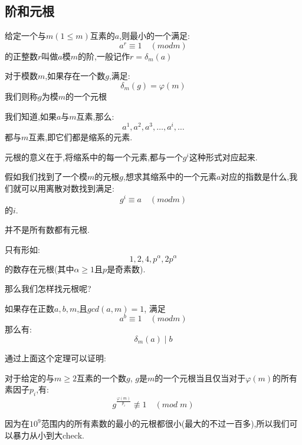 \documentclass[9pt]{beamer}
\begin{document}
		\subsection{阶和元根}
		\begin{frame}
			\begin{definition}[阶]
				给定一个与$m(1 \leq m)$互素的$a$,则最小的一个满足:
				$$
					a^r \equiv 1 \quad (mod m)
				$$
				的正整数$r$叫做$a$模$m$的阶,一般记作$r = \delta_m(a)$
			\end{definition}
			
						\pause
			
			\begin{definition}[元根] 
				对于模数$m$,如果存在一个数$g$,满足:
				$$
					\delta_m(g) = \varphi(m)
				$$
				我们则称$g$为模$m$的一个元根
			\end{definition}
		\end{frame}
		\begin{frame}
			我们知道,如果$a$与$m$互素,那么:
			$$
				a^1, a^2, a^3,\dots,a^i,\dots
			$$
			都与$m$互素,即它们都是缩系的元素.
			
						\pause
			
			元根的意义在于,将缩系中的每一个元素,都与一个$g^i$这种形式对应起来.
			
			假如我们找到了一个模$m$的元根$g$,想求其缩系中的一个元素$a$对应的指数是什么,我们就可以用离散对数找到满足:
			$$
				g^i \equiv a \quad (mod m)
			$$
			的$i$.
		\end{frame}
		\begin{frame}
			并不是所有数都有元根.
			\begin{theorem}
				只有形如:
				$$
				1,2,4,p^{\alpha},2p^{\alpha}
				$$
				的数存在元根(其中$\alpha \geq 1$且$p$是奇素数).
			\end{theorem}
			
						\pause
			
			那么我们怎样找元根呢?
			
						\pause
			
			\begin{theorem}
				如果存在正数$a,b,m$,且$gcd(a,m) = 1$, 满足
				$$
				a^b \equiv 1 \quad (mod m)
				$$
				那么有:
				$$
				\delta_m(a) \mid b
				$$
			\end{theorem}
			
		\end{frame}
		\begin{frame}
			通过上面这个定理可以证明:
			\begin{theorem}
				对于给定的与$m \geq 2$互素的一个数$g$, $g$是$m$的一个元根当且仅当对于$\varphi(m)$的所有素因子$p_i$,有:
				$$
				g^{\frac{\varphi(m)}{p_i}} \not \equiv 1 \quad (mod \; m)
				$$
			\end{theorem}
			
						\pause
			
			因为在$10^9$范围内的所有素数的最小的元根都很小(最大的不过一百多),所以我们可以暴力从小到大check.
		\end{frame}
\end{document}
